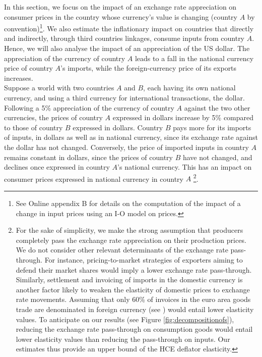 \documentclass[11pt,a4paper]{paper} %
\begin{document}
In this section, we focus on the impact of an exchange rate appreciation on consumer prices in the country whose currency’s value is changing (country $A$ by convention)\footnote{See Online appendix B for details on the computation of the impact of a change in input prices using an I-O model on prices.}. 
We also estimate the inflationary impact on countries that directly and indirectly, through third countries linkages, consume inputs from country $A$. Hence, we will also analyse the impact of an appreciation of the US dollar.
The appreciation of the currency of country $A$ leads to a fall in the national currency price of country $A$'s imports, while the foreign-currency price of its exports increases. \\
Suppose a world with two countries $A$ and $B$, each having its own national currency, and using a third currency for international transactions, the dollar.
Following a 5$\%$ appreciation of the currency of country $A$ against the two other currencies, the prices of country $A$ expressed in dollars increase by 5$\%$ compared to those of country $B$ expressed in dollars. 
Country $B$ pays more for its imports of inputs, in dollars as well as in national currency, since its exchange rate against the dollar has not changed. 
Conversely, the price of imported inputs in country $A$ remains constant in dollars, since the prices of country $B$ have not changed, and declines once expressed in country $A$'s national currency. 
This has an impact on consumer prices expressed in national currency in country $A$ \footnote{For the sake of simplicity, we make the strong assumption that producers completely pass the exchange rate appreciation on their production prices.  We do not consider other relevant determinants of the exchange rate pass-through. For instance, pricing-to-market strategies of exporters aiming to defend their market shares would imply a lower exchange rate pass-through.
Similarly, settlement and invoicing of imports in the domestic currency is another factor likely to weaken the elasticity of domestic prices to exchange rate movements. Assuming that only 60\% of invoices in the euro area goods trade are denominated in foreign currency (see \cite{Ortega2020}) would entail lower elasticity values. To anticipate on our results (see Figure \ref{fig:decompositionofs}), reducing the exchange rate pass-through on consumption goods would entail lower elasticity values than reducing the pass-through on inputs. Our estimates thus provide an upper bound of the HCE deflator elasticity.}.\\
\end{document}
